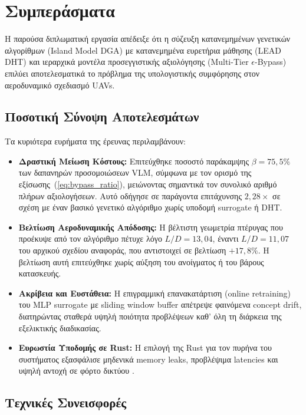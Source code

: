 \section{Συμπεράσματα}
\label{sec:conclusion_summary}

Η παρούσα διπλωματική εργασία απέδειξε ότι η σύζευξη κατανεμημένων γενετικών αλγορίθμων (Island Model DGA) με κατανεμημένα ευρετήρια μάθησης (LEAD DHT) και ιεραρχικά μοντέλα προσεγγιστικής αξιολόγησης (Multi-Tier $\epsilon$-Bypass) επιλύει αποτελεσματικά το πρόβλημα της υπολογιστικής συμφόρησης στον αεροδυναμικό σχεδιασμό UAVs.

\subsection*{Ποσοτική Σύνοψη Αποτελεσμάτων}

Τα κυριότερα ευρήματα της έρευνας περιλαμβάνουν:
\begin{itemize}
    \item \textbf{Δραστική Μείωση Κόστους:} Επιτεύχθηκε ποσοστό παράκαμψης $\beta = 75{,}5\%$ των δαπανηρών προσομοιώσεων VLM, σύμφωνα με τον ορισμό της εξίσωσης~(\ref{eq:bypass_ratio}), μειώνοντας σημαντικά τον συνολικό αριθμό πλήρων αξιολογήσεων. Αυτό οδήγησε σε παράγοντα επιτάχυνσης $2{,}28\times$ σε σχέση με έναν βασικό γενετικό αλγόριθμο χωρίς υποδομή surrogate ή DHT.
    \item \textbf{Βελτίωση Αεροδυναμικής Απόδοσης:} Η βέλτιστη γεωμετρία πτέρυγας που προέκυψε από τον αλγόριθμο πέτυχε λόγο $L/D = 13{,}04$, έναντι $L/D = 11{,}07$ του αρχικού σχεδίου αναφοράς, που αντιστοιχεί σε βελτίωση $+17{,}8\%$. Η βελτίωση αυτή επιτεύχθηκε χωρίς αύξηση του ανοίγματος ή του βάρους κατασκευής.
    \item \textbf{Ακρίβεια και Ευστάθεια:} Η επιγραμμική επανακατάρτιση (online retraining) του MLP surrogate με sliding window buffer απέτρεψε φαινόμενα concept drift, διατηρώντας σταθερά υψηλή ποιότητα προβλέψεων καθ' όλη τη διάρκεια της εξελικτικής διαδικασίας.
    \item \textbf{Ευρωστία Υποδομής σε Rust:} Η επιλογή της Rust για τον πυρήνα του συστήματος εξασφάλισε μηδενικά memory leaks, προβλέψιμα latencies και υψηλή αντοχή σε φόρτο δικτύου \cite{matsakis2014rust}.
\end{itemize}

\subsection*{Τεχνικές Συνεισφορές}

